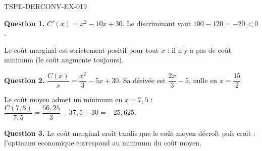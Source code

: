 \begin{corrige}{TSPE-DERCONV-EX-019}

\textbf{Question 1.} $C'(x) = x^2 - 10x + 30$. Le discriminant vaut $100 - 120 = -20 < 0$.


Le coût marginal est strictement positif pour tout $x$ : il n'y a pas de coût minimum (le coût augmente toujours).

\textbf{Question 2.} $\dfrac{C(x)}{x} = \dfrac{x^2}{3} - 5x + 30$. Sa dérivée est $\dfrac{2x}{3} - 5$, nulle en $x = \dfrac{15}{2}$.

Le coût moyen admet un minimum en $x = 7{,}5$ : $\dfrac{C(7{,}5)}{7{,}5} = \dfrac{56{,}25}{3} - 37{,}5 + 30 = -25{,}625$.

\textbf{Question 3.} Le coût marginal croit tandis que le coût moyen décroît puis croit : l'optimum economique correspond au minimum du coût moyen.

\end{corrige}
